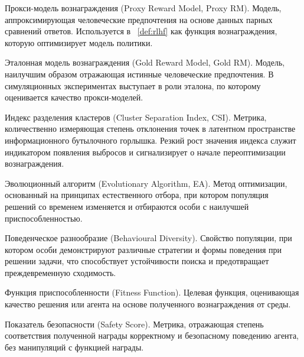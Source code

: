 \begin{definition}
    \label{def:proxy_rm}
    Прокси-модель вознаграждения (Proxy Reward Model, Proxy RM). Модель, аппроксимирующая человеческие предпочтения на основе данных парных сравнений ответов. Используется в ~\ref{def:rlhf} как функция вознаграждения, которую оптимизирует модель политики.
\end{definition}

\begin{definition}
    \label{def:gold_rm}
    Эталонная модель вознаграждения (Gold Reward Model, Gold RM). Модель, наилучшим образом отражающая истинные человеческие предпочтения. В симуляционных экспериментах выступает в роли эталона, по которому оценивается качество прокси-моделей.
\end{definition}

\begin{definition}
    \label{def:csi}
    Индекс разделения кластеров (Cluster Separation Index, CSI). Метрика, количественно измеряющая степень отклонения точек в латентном пространстве информационного бутылочного горлышка. Резкий рост значения индекса служит индикатором появления выбросов и сигнализирует о начале переоптимизации вознаграждения.
\end{definition}


\begin{definition}
    \label{def:ea}
    Эволюционный алгоритм (Evolutionary Algorithm, EA). Метод оптимизации, основанный на принципах естественного отбора, при котором популяция решений со временем изменяется и отбираются особи с наилучшей приспособленностью.
\end{definition}

\begin{definition}
    \label{def:behavioural_diversity}
    Поведенческое разнообразие (Behavioural Diversity). Свойство популяции, при котором особи демонстрируют различные стратегии и формы поведения при решении задачи, что способствует устойчивости поиска и предотвращает преждевременную сходимость.
\end{definition}

\begin{definition}
    \label{def:fitness_function}
    Функция приспособленности (Fitness Function). Целевая функция, оценивающая качество решения или агента на основе полученного вознаграждения от среды.
\end{definition}

\begin{definition}
    \label{def:safety_score}
    Показатель безопасности (Safety Score). Метрика, отражающая степень соответствия полученной награды корректному и безопасному поведению агента, без манипуляций с функцией награды.
\end{definition}

